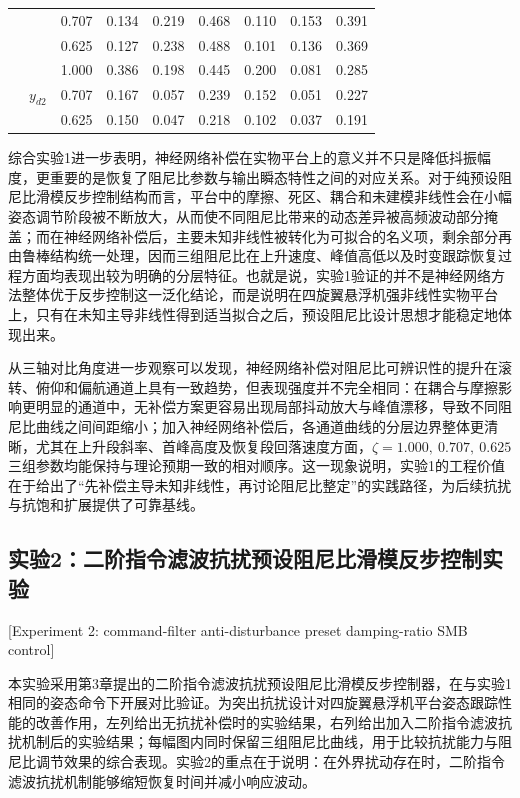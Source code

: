 \begin{table}[htbp]
{\begin{tabular}{ccccccccc}
      &                         & 0.707 & 0.134 & 0.219 & 0.468 & 0.110 & 0.153 & 0.391 \\
      &                         & 0.625 & 0.127 & 0.238 & 0.488 & 0.101 & 0.136 & 0.369 \\
      & \multirow{3}{*}{$y_{d2}$} & 1.000 & 0.386 & 0.198 & 0.445 & 0.200 & 0.081 & 0.285 \\
      &                         & 0.707 & 0.167 & 0.057 & 0.239 & 0.152 & 0.051 & 0.227 \\
      &                         & 0.625 & 0.150 & 0.047 & 0.218 & 0.102 & 0.037 & 0.191 \\
    \bottomrule
  \end{tabular}
  }
\end{table}
\endgroup
\FloatBarrier

综合实验1进一步表明，神经网络补偿在实物平台上的意义并不只是降低抖振幅度，更重要的是恢复了阻尼比参数与输出瞬态特性之间的对应关系。对于纯预设阻尼比滑模反步控制结构而言，平台中的摩擦、死区、耦合和未建模非线性会在小幅姿态调节阶段被不断放大，从而使不同阻尼比带来的动态差异被高频波动部分掩盖；而在神经网络补偿后，主要未知非线性被转化为可拟合的名义项，剩余部分再由鲁棒结构统一处理，因而三组阻尼比在上升速度、峰值高低以及时变跟踪恢复过程方面均表现出较为明确的分层特征。也就是说，实验1验证的并不是神经网络方法整体优于反步控制这一泛化结论，而是说明在四旋翼悬浮机强非线性实物平台上，只有在未知主导非线性得到适当拟合之后，预设阻尼比设计思想才能稳定地体现出来。

从三轴对比角度进一步观察可以发现，神经网络补偿对阻尼比可辨识性的提升在滚转、俯仰和偏航通道上具有一致趋势，但表现强度并不完全相同：在耦合与摩擦影响更明显的通道中，无补偿方案更容易出现局部抖动放大与峰值漂移，导致不同阻尼比曲线之间间距缩小；加入神经网络补偿后，各通道曲线的分层边界整体更清晰，尤其在上升段斜率、首峰高度及恢复段回落速度方面，$\zeta=1.000,\ 0.707,\ 0.625$ 三组参数均能保持与理论预期一致的相对顺序。这一现象说明，实验1的工程价值在于给出了“先补偿主导未知非线性，再讨论阻尼比整定”的实践路径，为后续抗扰与抗饱和扩展提供了可靠基线。

\subsection{实验2：二阶指令滤波抗扰预设阻尼比滑模反步控制实验}[Experiment 2: command-filter anti-disturbance preset damping-ratio SMB control]

本实验采用第3章提出的二阶指令滤波抗扰预设阻尼比滑模反步控制器，在与实验1相同的姿态命令下开展对比验证。为突出抗扰设计对四旋翼悬浮机平台姿态跟踪性能的改善作用，左列给出无抗扰补偿时的实验结果，右列给出加入二阶指令滤波抗扰机制后的实验结果；每幅图内同时保留三组阻尼比曲线，用于比较抗扰能力与阻尼比调节效果的综合表现。实验2的重点在于说明：在外界扰动存在时，二阶指令滤波抗扰机制能够缩短恢复时间并减小响应波动。

